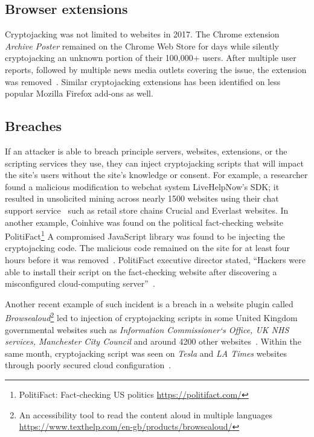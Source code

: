 \subsection{Browser extensions} 

Cryptojacking was not limited to websites in 2017. The Chrome extension \textit{Archive Poster} remained on the Chrome Web Store for days while silently cryptojacking an unknown portion of their 100,000+ users. After multiple user reports, followed by multiple news media outlets covering the issue, the extension was removed~\cite{chromeextentioncoinhive}. Similar cryptojacking extensions has been identified on less popular Mozilla Firefox add-ons as well. 


\subsection{Breaches} 

If an attacker is able to breach principle servers, websites, extensions, or the scripting services they use, they can inject cryptojacking scripts that will impact the site's users without the site's knowledge or consent. For example, a researcher found a malicious modification to webchat system LiveHelpNow's SDK; it resulted in unsolicited mining across nearly 1500 websites using their chat support service~\cite{chatsupporthack} such as retail store chains Crucial and Everlast websites. In another example, Coinhive was found on the political fact-checking website PolitiFact\footnote{PolitiFact: Fact-checking US politics \url{https://politifact.com/}} A compromised JavaScript library was found to be injecting the cryptojacking code. The malicious code remained on the site for at least four hours before it was removed~\cite{politifactcoinhive}. PolitiFact executive director stated, ``Hackers were able to install their script on the fact-checking website after discovering a misconfigured cloud-computing server''~\cite{politifactcoinhivewsj}. 

Another recent example of such incident is a breach in a website plugin called \textit{Browsealoud}\footnote{An accessibility tool to read the content aloud in multiple languages \url{https://www.texthelp.com/en-gb/products/browsealoud/}} led to injection of cryptojacking scripts in some United Kingdom governmental websites such as \textit{Information Commissioner`s Office, UK NHS services, Manchester City Council} and around 4200 other websites~\cite{theregisterukgovern}. Within the same month, cryptojacking script was seen on \textit{Tesla} and \textit{LA Times} websites through poorly secured cloud configuration~\cite{nakedsecurityLatimes}.

